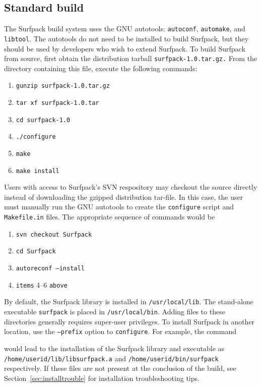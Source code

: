 \documentclass{article}
\begin{document}
\subsection{Standard build}
The Surfpack build system uses the GNU autotools: \texttt{autoconf}, \texttt{automake}, and
\texttt{libtool}.  The autotools do not need to be installed to build Surfpack, but they
should be used by developers who wish to extend Surfpack.  To build Surfpack
from source, first obtain the distribution tarball \texttt{surfpack-1.0.tar.gz.}  From
the directory containing this file, execute the following commands:
\begin{enumerate}
\item \texttt{gunzip surfpack-1.0.tar.gz}
\item \texttt{tar xf surfpack-1.0.tar}
\item \texttt{cd surfpack-1.0}
\item \texttt{./configure}
\item \texttt{make}
\item \texttt{make install}
\end{enumerate}

Users with access to Surfpack's SVN respository may checkout the source directly
instead of downloading the gzipped distribution tar-file.  In this case, the
user must manually run the GNU autotools to create the \texttt{configure} script and
\texttt{Makefile.in} files.  The appropriate sequence of commands would be
\begin{enumerate}
\item \texttt{svn checkout Surfpack}
\item \texttt{cd Surfpack}
\item \texttt{autoreconf --install}
\item \texttt{items} 4--6 \texttt{above}
\end{enumerate}
By default, the Surfpack library is installed in \texttt{/usr/local/lib}.  The stand-alone executable 
\texttt{surfpack} is placed in \texttt{/usr/local/bin}.  Adding files to
these directories generally requires super-user privileges.  To install Surfpack
in another location, use the \texttt{--prefix} option to \texttt{configure}.  For example, the command

would lead to the installation of the Surfpack library and executable as
\texttt{/home/userid/lib/libsurfpack.a} and \texttt{/home/userid/bin/surfpack}
 respectively. If
these files are not present at the conclusion of the build, see Section~\ref{sec:installtrouble} for
installation troubleshooting tips.
\end{document}
